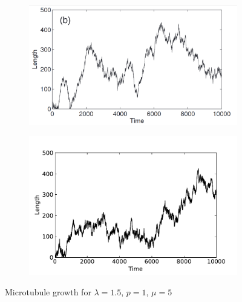 \documentclass[11pt]{article}
\begin{document}
\begin{figure}[!h]
	\centering
	\begin{subfigure}{\linewidth}
		\centering
		\includegraphics[width=\linewidth]{plots/1b.png}
	\end{subfigure}
	\begin{subfigure}{\linewidth}
		\centering
		\includegraphics[width=\linewidth]{plots/1b.pdf}
	\end{subfigure}
	\caption{Microtubule growth for $\lambda=1.5$, $p=1$, $\mu=5$}
\end{figure}
\end{document}
